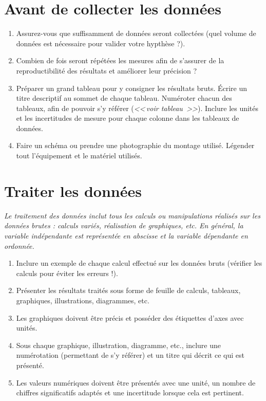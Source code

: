\section{Avant de collecter les données}

\begin{enumerate}
%
\item Assurez-vous que suffisamment de données seront collectées (quel volume de données est nécessaire pour valider votre hypthèse ?).
\item Combien de fois seront répétées les mesures afin de s'assurer de la reproductibilité des résultats et améliorer leur précision ?
\item Préparer un grand tableau pour y consigner les résultats bruts. Écrire un titre descriptif au sommet de chaque tableau. Numéroter chacun des tableaux, afin de pouvoir s'y référer (\emph{<<\,voir tableau \,>>}). Inclure les unités et les incertitudes de mesure pour chaque colonne dans les tableaux de données.
\item Faire un schéma ou prendre une photographie du montage utilisé. Légender tout l'équipement et le matériel utilisés.
\end{enumerate}





\section{Traiter les données}

\textsl{Le traitement des données inclut tous les calculs ou manipulations réalisés sur les données brutes : calculs variés, réalisation de graphiques, etc. En général, la variable indépendante est représentée en abscisse et la variable dépendante en ordonnée.}

\begin{enumerate}
\item Inclure un exemple de chaque calcul effectué sur les données bruts (vérifier les calculs pour éviter les erreurs !).
\item Présenter les résultats traités sous forme de feuille de calculs, tableaux, graphiques, illustrations, diagrammes, etc.
\item Les graphiques doivent être précis et posséder des étiquettes d'axes avec unités.
\item Sous chaque graphique, illustration, diagramme, etc., inclure une numérotation (permettant de s'y référer) et un titre qui décrit ce qui est présenté.

\item Les valeurs numériques doivent être présentés avec une unité, un nombre de chiffres significatifs adaptés et une incertitude lorsque cela est pertinent.
\end{enumerate}




